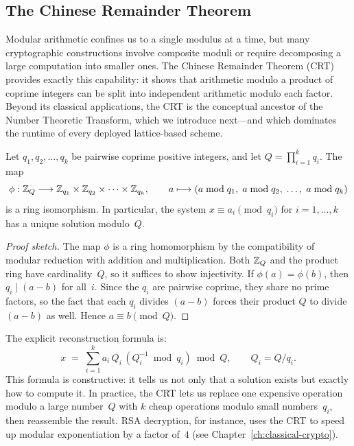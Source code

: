 \subsection{The Chinese Remainder Theorem}
\label{subsec:crt}

Modular arithmetic confines us to a single modulus at a time, but many cryptographic constructions involve composite moduli or require decomposing a large computation into smaller ones.  The Chinese Remainder Theorem (CRT) provides exactly this capability: it shows that arithmetic modulo a product of coprime integers can be split into independent arithmetic modulo each factor.  Beyond its classical applications, the CRT is the conceptual ancestor of the Number Theoretic Transform, which we introduce next---and which dominates the runtime of every deployed lattice-based scheme.

\begin{theorem}
\label{thm:crt}
Let $q_1, q_2, \ldots, q_k$ be pairwise coprime positive integers, and let $Q = \prod_{i=1}^k q_i$.  The map
\begin{equation}
\label{eq:crt-iso}
\phi : \mathbb{Z}_Q \longrightarrow \mathbb{Z}_{q_1} \times \mathbb{Z}_{q_2} \times \cdots \times \mathbb{Z}_{q_k}, \qquad a \longmapsto (a \bmod q_1, \; a \bmod q_2, \; \ldots, \; a \bmod q_k)
\end{equation}
is a ring isomorphism.  In particular, the system $x \equiv a_i \pmod{q_i}$ for $i = 1, \ldots, k$ has a unique solution modulo~$Q$.
\end{theorem}

\begin{proof}[Proof sketch]
The map $\phi$ is a ring homomorphism by the compatibility of modular reduction with addition and multiplication.  Both $\mathbb{Z}_Q$ and the product ring have cardinality~$Q$, so it suffices to show injectivity.  If $\phi(a) = \phi(b)$, then $q_i \mid (a - b)$ for all~$i$.  Since the $q_i$ are pairwise coprime, they share no prime factors, so the fact that each $q_i$ divides $(a-b)$ forces their product $Q$ to divide $(a-b)$ as well.  Hence $a \equiv b \pmod{Q}$.
\end{proof}

The explicit reconstruction formula is:
\begin{equation}
\label{eq:crt-explicit}
x \;=\; \sum_{i=1}^{k} a_i \, Q_i \, (Q_i^{-1} \bmod q_i) \bmod Q, \qquad Q_i = Q / q_i.
\end{equation}
This formula is constructive: it tells us not only that a solution exists but exactly how to compute it.  In practice, the CRT lets us replace one expensive operation modulo a large number~$Q$ with $k$ cheap operations modulo small numbers~$q_i$, then reassemble the result.  RSA decryption, for instance, uses the CRT to speed up modular exponentiation by a factor of~$4$ (see Chapter~\ref{ch:classical-crypto}).

